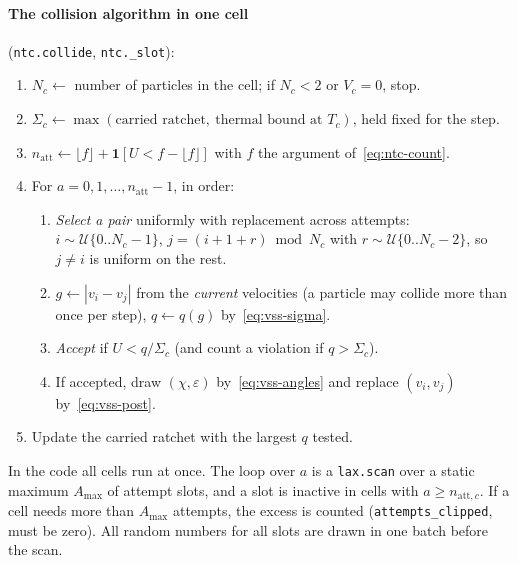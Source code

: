 \documentclass[11pt,a4paper]{article}
\numberwithin{equation}{section}
\newcommand{\ind}{\mathbf{1}}
\newcommand{\code}[1]{\texttt{#1}}
\begin{document}
\paragraph{The collision algorithm in one cell} (\code{ntc.collide}, \code{ntc.\_slot}):
\begin{enumerate}
\item $N_c\leftarrow$ number of particles in the cell; if $N_c < 2$ or $V_c = 0$, stop.
\item $\Sigma_c\leftarrow\max(\text{carried ratchet},\ \text{thermal bound at } T_c)$,
  held fixed for the step.
\item $n_{\mathrm{att}}\leftarrow\lfloor f\rfloor + \ind[U < f - \lfloor f\rfloor]$ with
  $f$ the argument of~\eqref{eq:ntc-count}.
\item For $a = 0, 1, \dots, n_{\mathrm{att}}-1$, in order:
  \begin{enumerate}
  \item \emph{Select a pair} uniformly with replacement across attempts:
    $i\sim\mathcal U\{0..N_c-1\}$, $j = (i + 1 + r)\bmod N_c$ with
    $r\sim\mathcal U\{0..N_c-2\}$, so $j\ne i$ is uniform on the rest.
  \item $g\leftarrow|v_i - v_j|$ from the \emph{current} velocities (a particle may
    collide more than once per step), $q\leftarrow q(g)$ by~\eqref{eq:vss-sigma}.
  \item \emph{Accept} if $U < q/\Sigma_c$ (and count a violation if $q > \Sigma_c$).
  \item If accepted, draw $(\chi, \varepsilon)$ by~\eqref{eq:vss-angles} and replace
    $(v_i, v_j)$ by~\eqref{eq:vss-post}.
  \end{enumerate}
\item Update the carried ratchet with the largest $q$ tested.
\end{enumerate}
In the code all cells run at once.  The loop over $a$ is a \code{lax.scan} over a
static maximum $A_{\max}$ of attempt slots, and a slot is inactive in cells with
$a\ge n_{\mathrm{att},c}$.  If a cell needs more than $A_{\max}$ attempts, the excess
is counted (\code{attempts\_clipped}, must be zero).  All random numbers for all
slots are drawn in one batch before the scan.
\end{document}

